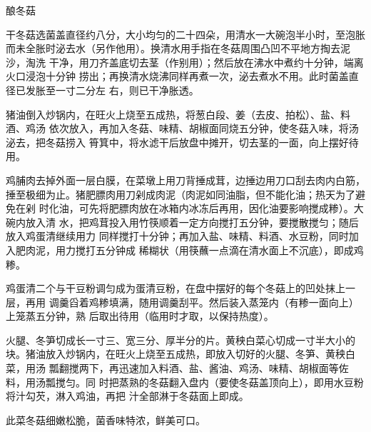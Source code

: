 \begin{recipe}{酿冬菇}

\ingredients


\preparation

\step 干冬菇选菌盖直径约八分，大小均匀的二十四朵，用清水一大碗泡半小时，至泡胀
而未全胀时泌去水（另作他用）。换清水用手指在冬菇周围凸凹不平地方掏去泥沙，淘洗
干净，用刀齐盖底切去茎（作别用）；然后放在沸水中煮约十分钟，端离火口浸泡十分钟
捞出；再换清水烧沸同样再煮一次，泌去煮水不用。此时菌盖直径已发胀至一寸二分左
右，则已干净胀透。

猪油倒入炒锅内，在旺火上烧至五成热，将葱白段、姜（去皮、拍松）、盐、料酒、鸡汤
依次放入，再加入冬菇、味精、胡椒面同烧五分钟，使冬菇入味，将汤泌去，把冬菇捞入
筲箕中，将水滤干后放盘中摊开，切去茎的一面，向上摆好待用。

\step 鸡脯肉去掉外面一层白膜，在菜墩上用刀背捶成茸，边捶边用刀口刮去肉内白筋，
捶至极细为止。猪肥膘肉用刀剁成肉泥（肉泥如同油脂，但不能化油；热天为了避免在剁
时化油，可先将肥膘肉放在冰箱内冰冻后再用，因化油要影响搅成糁）。大碗内放入清
水，把鸡茸投入用竹筷顺着一定方向搅打五分钟，要搅散搅匀；随后放入鸡蛋清继续用力
同样搅打十分钟；再加入盐、味精、料酒、水豆粉，同时加入肥肉泥，用力搅打五分钟成
稀糊状（用筷蘸一点滴在清水面上不沉底），即成鸡糁。

鸡蛋清二个与干豆粉调匀成为蛋清豆粉，在盘中摆好的每个冬菇上的凹处抹上一层，再用
调羹舀着鸡糁填满，随用调羹刮平。然后装入蒸笼内（有糁一面向上）上笼蒸五分钟，熟
后取出待用（临用时才取，以保持热度）。

\step 火腿、冬笋切成长一寸三、宽三分、厚半分的片。黄秧白菜心切成一寸半大小的
块。猪油放入炒锅内，在旺火上烧至五成热，即放入切好的火腿、冬笋、黄秧白菜，用汤
瓢翻搅两下，再迅速加入料酒、盐、酱油、鸡汤、味精、胡椒面等佐料，用汤瓢搅匀。同
时把蒸熟的冬菇翻入盘内（要使冬菇盖顶向上），即用水豆粉将汁勾芡，淋入鸡油，再把
汁全部淋于冬菇面上即成。

\features

此菜冬菇细嫩松脆，菌香味特浓，鲜美可口。

\end{recipe}

